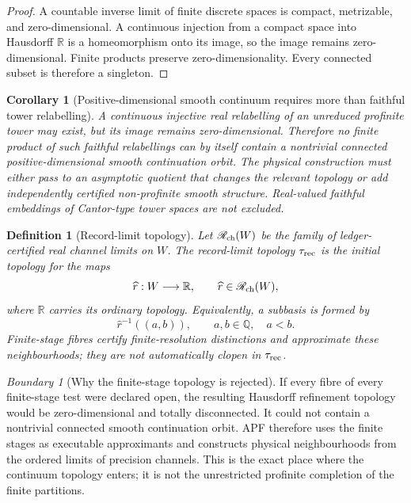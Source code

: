 \documentclass[11pt]{article}
\newtheorem{corollary}[theorem]{Corollary}
\newtheorem{definition}[theorem]{Definition}
\theoremstyle{remark}
\newtheorem{warning}[theorem]{Boundary}
\begin{document}
\begin{proof}
A countable inverse limit of finite discrete spaces is compact, metrizable, and
zero-dimensional. A continuous injection from a compact space into Hausdorff
\(\mathbb R\) is a homeomorphism onto its image, so the image remains
zero-dimensional. Finite products preserve zero-dimensionality. Every connected
subset is therefore a singleton.
\end{proof}

\begin{corollary}[Positive-dimensional smooth continuum requires more than faithful tower relabelling]
\label{cor:continuum-needs-quotient}
A continuous injective real relabelling of an unreduced profinite tower may
exist, but its image remains zero-dimensional.  Therefore no finite product of
such faithful relabellings can by itself contain a nontrivial connected
positive-dimensional smooth continuation orbit.  The physical construction
must either pass to an asymptotic quotient that changes the relevant topology
or add independently certified non-profinite smooth structure.  Real-valued
faithful embeddings of Cantor-type tower spaces are not excluded.
\end{corollary}

\begin{definition}[Record-limit topology]
\label{def:record-limit-topology}
Let $\mathscr R_{\rm ch}(W)$ be the family of ledger-certified real channel
limits on $W$.  The \emph{record-limit topology} $\tau_{\rm rec}$ is the
initial topology for the maps
\[
        \widehat r:W\longrightarrow\mathbb R,
        \qquad \widehat r\in\mathscr R_{\rm ch}(W),
\]
where $\mathbb R$ carries its ordinary topology.  Equivalently, a subbasis is
formed by
\[
        \widehat r^{-1}((a,b)),
        \qquad a,b\in\mathbb Q,
        \quad a<b.
\]
Finite-stage fibres certify finite-resolution distinctions and approximate
these neighbourhoods; they are not automatically clopen in $\tau_{\rm rec}$.
\end{definition}

\begin{warning}[Why the finite-stage topology is rejected]
If every fibre of every finite-stage test were declared open, the resulting
Hausdorff refinement topology would be zero-dimensional and totally
disconnected.  It could not contain a nontrivial connected smooth continuation
orbit.  APF therefore uses the finite stages as executable approximants and
constructs physical neighbourhoods from the ordered limits of precision
channels.  This is the exact place where the continuum topology enters; it is
not the unrestricted profinite completion of the finite partitions.
\end{warning}
\end{document}
